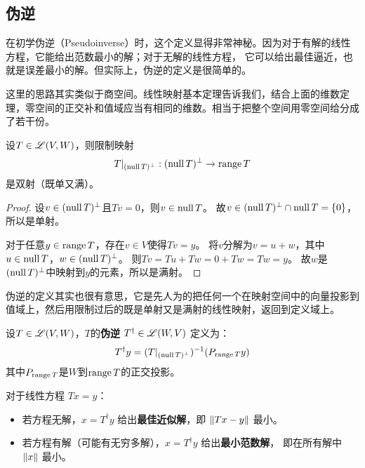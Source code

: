 \subsection{伪逆}

在初学伪逆（Pseudoinverse）时，这个定义显得非常神秘。因为对于有解的线性方程，它能给出范数最小的解；对于无解的线性方程，
它可以给出最佳逼近，也就是误差最小的解。但实际上，伪逆的定义是很简单的。

这里的思路其实类似于商空间。线性映射基本定理告诉我们，结合上面的维数定理，零空间的正交补和值域应当有相同的维数。相当于把整个空间用零空间给分成了若干份。

\begin{theorem}
    设\(T \in \mathscr{L}(V, W)\)，则限制映射
    \[
        T|_{(\operatorname{null} T)^\perp} : (\operatorname{null} T)^\perp \to \operatorname{range} T
    \]
    是双射（既单又满）。
\end{theorem}

\begin{proof}
    设\(v \in (\operatorname{null} T)^\perp\)且\(Tv = 0\)，则\(v \in \operatorname{null} T\)。
    故\(v \in (\operatorname{null} T)^\perp \cap \operatorname{null} T = \{0\}\)，所以是单射。

    对于任意\(y \in \operatorname{range} T\)，存在\(v \in V\)使得\(Tv = y\)。
    将\(v\)分解为\(v = u + w\)，其中\(u \in \operatorname{null} T\)，\(w \in
    (\operatorname{null} T)^\perp\)。
    则\(Tv = Tu + Tw = 0 + Tw = Tw = y\)。
    故\(w\)是\((\operatorname{null} T)^\perp\)中映射到\(y\)的元素，所以是满射。
\end{proof}

伪逆的定义其实也很有意思，它是先人为的把任何一个在映射空间中的向量投影到值域上，然后用限制过后的既是单射又是满射的线性映射，返回到定义域上。

\begin{definition}[伪逆]
    设\(T \in \mathscr{L}(V, W)\)，\(T\)的\textbf{伪逆} \(T^\dagger \in \mathscr{L}(W, V)\) 定义为：
    \[
        T^\dagger y = (T|_{(\operatorname{null} T)^\perp})^{-1} (P_{\operatorname{range} T} y)
    \]
    其中\(P_{\operatorname{range} T}\)是\(W\)到\(\operatorname{range} T\)的正交投影。
\end{definition}

\begin{theorem}[伪逆的性质]
    对于线性方程 \(Tx = y\)：
    \begin{itemize}
        \item 若方程无解，\(x = T^\dagger y\) 给出\textbf{最佳近似解}，即
            \(\lVert Tx - y\rVert\) 最小。
        \item 若方程有解（可能有无穷多解），\(x = T^\dagger y\) 给出\textbf{最小范数解}，
            即在所有解中 \(\lVert x\rVert\) 最小。
    \end{itemize}
\end{theorem}

